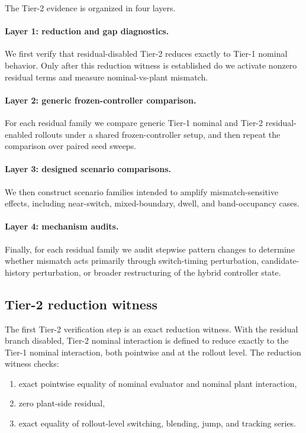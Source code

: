 The Tier-2 evidence is organized in four layers.

\paragraph{Layer 1: reduction and gap diagnostics.}
We first verify that residual-disabled Tier-2 reduces exactly to Tier-1 nominal behavior. Only after this reduction witness is established do we activate nonzero residual terms and measure nominal-vs-plant mismatch.

\paragraph{Layer 2: generic frozen-controller comparison.}
For each residual family we compare generic Tier-1 nominal and Tier-2 residual-enabled rollouts under a shared frozen-controller setup, and then repeat the comparison over paired seed sweeps.

\paragraph{Layer 3: designed scenario comparisons.}
We then construct scenario families intended to amplify mismatch-sensitive effects, including near-switch, mixed-boundary, dwell, and band-occupancy cases.

\paragraph{Layer 4: mechanism audits.}
Finally, for each residual family we audit stepwise pattern changes to determine whether mismatch acts primarily through switch-timing perturbation, candidate-history perturbation, or broader restructuring of the hybrid controller state.

\subsection{Tier-2 reduction witness}
\label{subsec:tier2_reduction}

The first Tier-2 verification step is an exact reduction witness. With the residual branch disabled, Tier-2 nominal interaction is defined to reduce exactly to the Tier-1 nominal interaction, both pointwise and at the rollout level. The reduction witness checks:
\begin{enumerate}
    \item exact pointwise equality of nominal evaluator and nominal plant interaction,
    \item zero plant-side residual,
    \item exact equality of rollout-level switching, blending, jump, and tracking series.
\end{enumerate}

